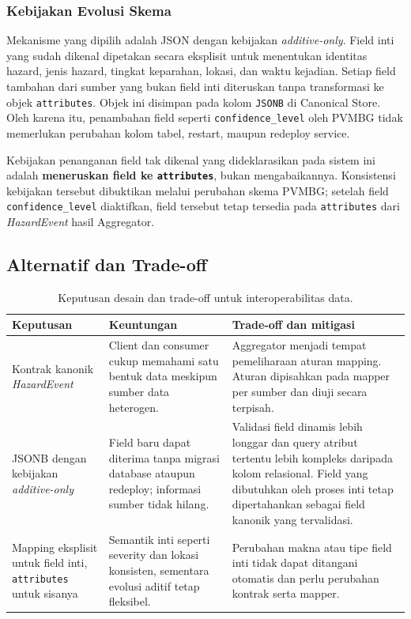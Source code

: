 \subsubsection{Kebijakan Evolusi Skema}
Mekanisme yang dipilih adalah JSON dengan kebijakan \textit{additive-only}.
Field inti yang sudah dikenal dipetakan secara eksplisit untuk menentukan
identitas hazard, jenis hazard, tingkat keparahan, lokasi, dan waktu kejadian.
Setiap field tambahan dari sumber yang bukan field inti diteruskan tanpa
transformasi ke objek \texttt{attributes}. Objek ini disimpan pada kolom
\texttt{JSONB} di Canonical Store. Oleh karena itu, penambahan field seperti
\texttt{confidence\_level} oleh PVMBG tidak memerlukan perubahan kolom tabel,
restart, maupun redeploy service.

Kebijakan penanganan field tak dikenal yang dideklarasikan pada sistem ini
adalah \textbf{meneruskan field ke \texttt{attributes}}, bukan mengabaikannya.
Konsistensi kebijakan tersebut dibuktikan melalui perubahan skema PVMBG;
setelah field \texttt{confidence\_level} diaktifkan, field tersebut tetap
tersedia pada \texttt{attributes} dari \textit{HazardEvent} hasil Aggregator.

\subsection{Alternatif dan Trade-off}
\begin{table}[H]
  \centering
  \small
  \begin{tabularx}{\textwidth}{p{3.1cm}XX}
    \toprule
    Keputusan & Keuntungan & Trade-off dan mitigasi \\
    \midrule
    Kontrak kanonik \textit{HazardEvent} &
    Client dan consumer cukup memahami satu bentuk data meskipun sumber data
    heterogen. &
    Aggregator menjadi tempat pemeliharaan aturan mapping. Aturan dipisahkan
    pada mapper per sumber dan diuji secara terpisah. \\
    \addlinespace
    JSONB dengan kebijakan \textit{additive-only} &
    Field baru dapat diterima tanpa migrasi database ataupun redeploy;
    informasi sumber tidak hilang. &
    Validasi field dinamis lebih longgar dan query atribut tertentu lebih
    kompleks daripada kolom relasional. Field yang dibutuhkan oleh proses inti
    tetap dipertahankan sebagai field kanonik yang tervalidasi. \\
    \addlinespace
    Mapping eksplisit untuk field inti, \texttt{attributes} untuk sisanya &
    Semantik inti seperti severity dan lokasi konsisten, sementara evolusi
    aditif tetap fleksibel. &
    Perubahan makna atau tipe field inti tidak dapat ditangani otomatis dan
    perlu perubahan kontrak serta mapper. \\
    \bottomrule
  \end{tabularx}
  \caption{Keputusan desain dan trade-off untuk interoperabilitas data.}
  \label{tab:problem-satu-tradeoff}
\end{table}

